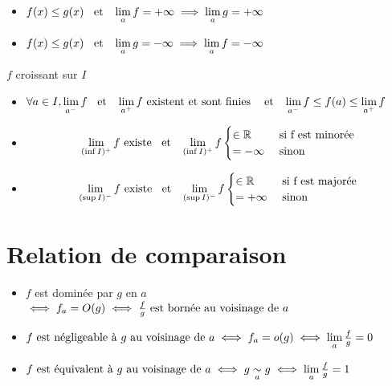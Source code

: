 \begin{thm}[de comparaison]
\begin{itemize}
    \item $f(x) \leq g(x) \et \lm_a f = +\infty 
    \implies \lm_a g = +\infty$
    \item $f(x) \leq g(x) \et \lm_a g = -\infty 
    \implies \lm_a f = -\infty$
\end{itemize}
\end{thm}

\pagebreak

\begin{thm}
$f$ croissant sur $I$
\begin{itemize}
    \item $\forall a \in I, \lm_{a^-} f \et \lm_{a^+} f 
    \text{ existent et sont finies }
    \et \lm_{a^-} f \leq f(a) \leq \lm_{a^+} f$
    \item \[
        \lm_{(\inf I)^+} f \text{ existe} \et
        \lm_{(\inf I)^+} f 
        \begin{cases}
            \in \R      &\text{ si f est minorée} \\
            = -\infty   &\text{ sinon}
        \end{cases}
    \]
    \item \[
        \lm_{(\sup I)^-} f \text{ existe} \et
        \lm_{(\sup I)^-} f 
        \begin{cases}
            \in \R      &\text{ si f est majorée} \\
            = +\infty   &\text{ sinon}
        \end{cases}
    \]
\end{itemize}
\end{thm}

\section{Relation de comparaison}

\begin{dfn}
\begin{itemize}
    \item $f$ est dominée par $g$ en $a$ $\iff f_a = O(g) \iff
    \frac{f}{g} \text{ est bornée} \voi{a}$
    \item $f \text{ est négligeable à } g \voi{a} \iff f_a = o(g)
    \iff \lm_a \frac{f}{g} = 0$
    \item $f \text{ est équivalent à } g \voi{a} \iff g \equ[a] g
    \iff \lm_a \frac{f}{g} = 1$
\end{itemize}
\end{dfn}

